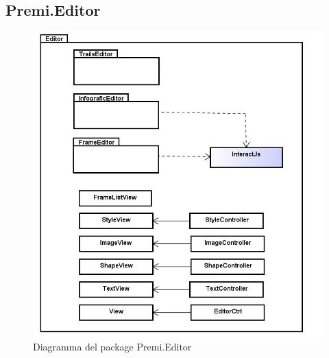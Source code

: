 \subsection{Premi.Editor}
\begin{figure}[h!]
\begin{center}
\includegraphics[scale=0.45]{img/diapkg/vecchi/editor-class.jpg}
\caption{Diagramma del package Premi.Editor}
\end{center}
\end{figure}
\clearpage
